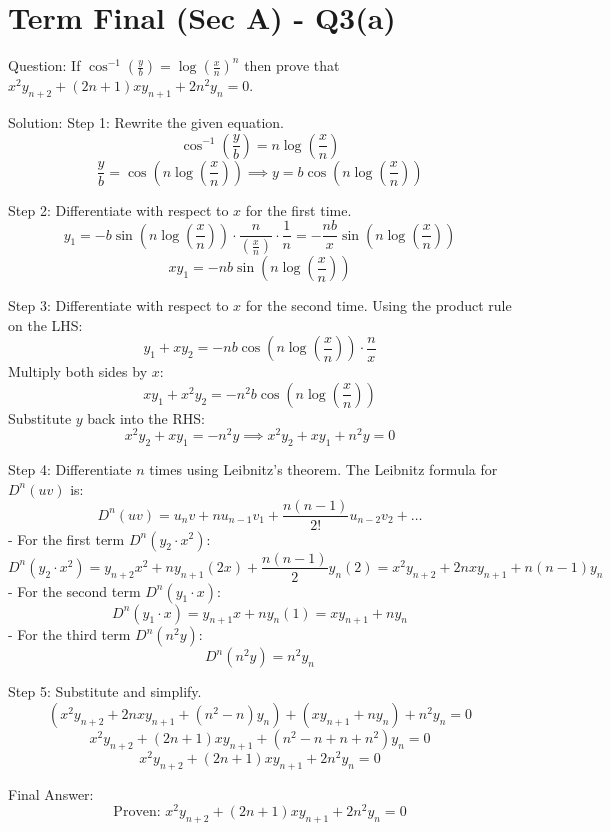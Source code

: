 \documentclass[11pt, a4paper]{article}
\begin{document}
\section*{Term Final (Sec A) - Q3(a)}
Question:
If $\cos^{-1}\left(\frac{y}{b}\right) = \log\left(\frac{x}{n}\right)^n$ then prove that $x^2 y_{n+2} + (2n + 1)xy_{n+1} + 2n^2 y_n = 0$.

Solution:
Step 1: Rewrite the given equation.
$$\cos^{-1}\left(\frac{y}{b}\right) = n \log\left(\frac{x}{n}\right)$$
$$\frac{y}{b} = \cos\left(n \log\left(\frac{x}{n}\right)\right) \implies y = b \cos\left(n \log\left(\frac{x}{n}\right)\right)$$

Step 2: Differentiate with respect to $x$ for the first time.
$$y_1 = -b \sin\left(n \log\left(\frac{x}{n}\right)\right) \cdot \frac{n}{\left(\frac{x}{n}\right)} \cdot \frac{1}{n} = -\frac{nb}{x} \sin\left(n \log\left(\frac{x}{n}\right)\right)$$
$$xy_1 = -nb \sin\left(n \log\left(\frac{x}{n}\right)\right)$$

Step 3: Differentiate with respect to $x$ for the second time.
Using the product rule on the LHS:
$$y_1 + xy_2 = -nb \cos\left(n \log\left(\frac{x}{n}\right)\right) \cdot \frac{n}{x}$$
Multiply both sides by $x$:
$$xy_1 + x^2 y_2 = -n^2 b \cos\left(n \log\left(\frac{x}{n}\right)\right)$$
Substitute $y$ back into the RHS:
$$x^2 y_2 + xy_1 = -n^2 y \implies x^2 y_2 + xy_1 + n^2 y = 0$$

Step 4: Differentiate $n$ times using Leibnitz's theorem.
The Leibnitz formula for $D^n(uv)$ is:
$$D^n(uv) = u_n v + n u_{n-1} v_1 + \frac{n(n-1)}{2!} u_{n-2} v_2 + \dots$$
- For the first term $D^n(y_2 \cdot x^2)$:
  $$D^n(y_2 \cdot x^2) = y_{n+2} x^2 + n y_{n+1} (2x) + \frac{n(n-1)}{2} y_n (2) = x^2 y_{n+2} + 2nxy_{n+1} + n(n-1)y_n$$
- For the second term $D^n(y_1 \cdot x)$:
  $$D^n(y_1 \cdot x) = y_{n+1} x + n y_n (1) = x y_{n+1} + n y_n$$
- For the third term $D^n(n^2 y)$:
  $$D^n(n^2 y) = n^2 y_n$$

Step 5: Substitute and simplify.
$$(x^2 y_{n+2} + 2nxy_{n+1} + (n^2-n)y_n) + (xy_{n+1} + ny_n) + n^2 y_n = 0$$
$$x^2 y_{n+2} + (2n + 1)xy_{n+1} + (n^2 - n + n + n^2)y_n = 0$$
$$x^2 y_{n+2} + (2n + 1)xy_{n+1} + 2n^2 y_n = 0$$

Final Answer:
$$
\boxed{\text{Proven: } x^2 y_{n+2} + (2n + 1)xy_{n+1} + 2n^2 y_n = 0}
$$

\end{document}
